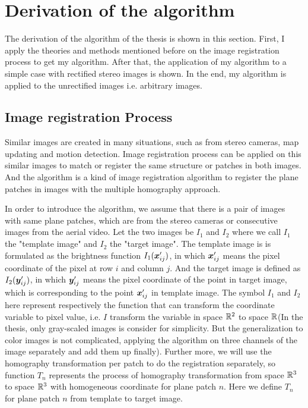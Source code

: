 \section{Derivation of the algorithm}\label{sec:Implementation}
The derivation of the algorithm of the thesis is shown in this section. First, I apply the theories and methods mentioned before on the image registration process to get my algorithm. After that, the application of my algorithm to a simple case with rectified stereo images is shown. In the end, my algorithm is applied to the unrectified images i.e. arbitrary images.
\subsection{Image registration Process}
Similar images are created in many situations, such as from stereo cameras, map updating and motion detection. Image registration process can be applied on this similar images to match or register the same structure or patches in both images. And the algorithm is a kind of image registration algorithm to register the plane patches in images with the multiple homography approach.

In order to introduce the algorithm, we assume that there is a pair of images with same plane patches, which are from the stereo cameras or consecutive images from the aerial video. Let the two images be $I_1$ and $I_2$ where we call $I_1$ the "template image" and $I_2$ the "target image". The template image is is formulated as the brightness function $I_1(\boldsymbol{x}'_{ij})$, in which $\boldsymbol{x}'_{ij}$ means the pixel coordinate of the pixel at row $i$ and column $j$. And the target image is defined as $I_2(\boldsymbol{y}'_{ij})$, in which $\boldsymbol{y}'_{ij}$ means the pixel coordinate of the point in target image, which is corresponding to the point $\boldsymbol{x}'_{ij}$ in template image. The symbol $I_1$ and $I_2$ here represent respectively the function that can transform the coordinate variable to pixel value, i.e. $I$ transform the variable in space $\mathbb{R}^{2}$ to space $\mathbb{R}$(In the thesis, only gray-scaled images is consider for simplicity. But the generalization to color images is not complicated, applying the algorithm on three channels of the image separately and add them up finally). Further more, we will use the homography transformation per patch to do the registration separately, so function $T_n$ represents the process of homography transformation from space $\mathbb{R}^{3}$ to space $\mathbb{R}^3$ with homogeneous coordinate for plane patch $n$. Here we define $T_n$ for plane patch $n$ from template to target image.

